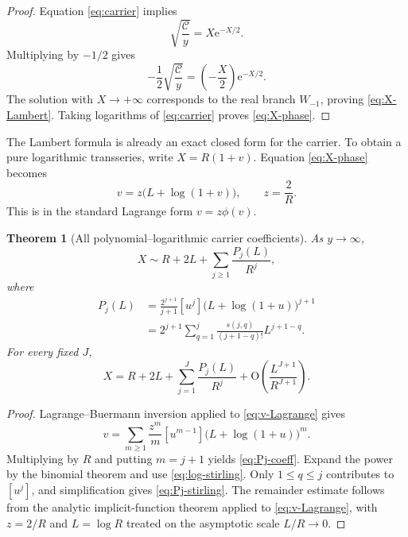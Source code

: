 \documentclass[11pt,a4paper]{article}
\numberwithin{equation}{section}
\newtheorem{theorem}{Theorem}[section]
\theoremstyle{remark}
\newcommand{\e}{\mathrm e}
\newcommand{\Ccal}{\mathcal C}
\newcommand{\bigO}{\mathrm O}
\begin{document}
\begin{proof}
Equation \cref{eq:carrier} implies
\[
 \sqrt{\frac{\Ccal}{y}}=X\e^{-X/2}.
\]
Multiplying by $-1/2$ gives
\[
 -\frac12\sqrt{\frac{\Ccal}{y}}
 =\left(-\frac X2\right)\e^{-X/2}.
\]
The solution with $X\to+\infty$ corresponds to the real branch $W_{-1}$, proving \cref{eq:X-Lambert}.  Taking logarithms of \cref{eq:carrier} proves \cref{eq:X-phase}.
\end{proof}

The Lambert formula is already an exact closed form for the carrier.  To obtain a pure logarithmic transseries, write $X=R(1+v)$.  Equation \cref{eq:X-phase} becomes
\begin{equation}\label{eq:v-Lagrange}
 v=z\bigl(L+\log(1+v)\bigr),\qquad z=\frac2R.
\end{equation}
This is in the standard Lagrange form $v=z\phi(v)$.

\begin{theorem}[All polynomial--logarithmic carrier coefficients]\label{thm:X-polynomials}
As $y\to\infty$,
\begin{equation}\label{eq:X-full-log}
 X\sim R+2L+\sum_{j\ge1}\frac{P_j(L)}{R^j},
\end{equation}
where
\begin{align}
 P_j(L)
 &=\frac{2^{j+1}}{j+1}[u^j]
 \bigl(L+\log(1+u)\bigr)^{j+1}
 \label{eq:Pj-coeff}\\
 &=2^{j+1}\sum_{q=1}^{j}
 \frac{s(j,q)}{(j+1-q)!}L^{j+1-q}.
 \label{eq:Pj-stirling}
\end{align}
For every fixed $J$,
\begin{equation}\label{eq:X-remainder}
 X=R+2L+\sum_{j=1}^{J}\frac{P_j(L)}{R^j}
 +\bigO\!\left(\frac{L^{J+1}}{R^{J+1}}\right).
\end{equation}
\end{theorem}

\begin{proof}
Lagrange--Buer\-mann inversion applied to \cref{eq:v-Lagrange} gives
\begin{equation}
 v=\sum_{m\ge1}\frac{z^m}{m}[u^{m-1}]
 \bigl(L+\log(1+u)\bigr)^m.
\end{equation}
Multiplying by $R$ and putting $m=j+1$ yields \cref{eq:Pj-coeff}.  Expand the power by the binomial theorem and use \cref{eq:log-stirling}.  Only $1\le q\le j$ contributes to $[u^j]$, and simplification gives \cref{eq:Pj-stirling}.  The remainder estimate follows from the analytic implicit-function theorem applied to \cref{eq:v-Lagrange}, with $z=2/R$ and $L=\log R$ treated on the asymptotic scale $L/R\to0$.
\end{proof}
\end{document}
